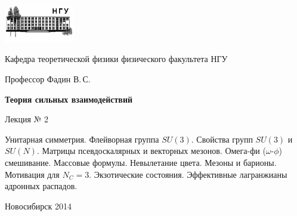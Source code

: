 \documentclass[12pt,pagesize,paper=192mm:108mm]{scrbook}
\begin{document}
\begin{titlepage}
  \vspace*{-1em}
  \begin{center}
    \includegraphics[width=0.23\textwidth]{../NSU-logo}

    Кафедра теоретической физики физического факультета НГУ
    \medskip

    \Large
    Профессор Фадин В.\,С.

    \huge
    \textbf{Теория сильных взаимодействий}
    \smallskip

    \Large
    Лекция № 2
    \vfill

    \normalsize
    \begin{minipage}{0.65\linewidth}
      Унитарная симметрия. Флейворная группа $SU(3)$. Свойства групп
      $SU(3)$ и $SU(N)$. Матрицы псевдоскалярных и векторных
      мезонов. Омега-фи ($\omega$-$\phi$) смешивание. Массовые
      формулы. Невылетание цвета. Мезоны и барионы. Мотивация для
      $N_C=3$. Экзотические состояния. Эффективные лагранжианы
      адронных распадов.
    \end{minipage}
    \vfill

    \normalsize \ccbysa\hspace{0.5em} Новосибирск 2014   
  \end{center}
\end{titlepage}
\end{document}
